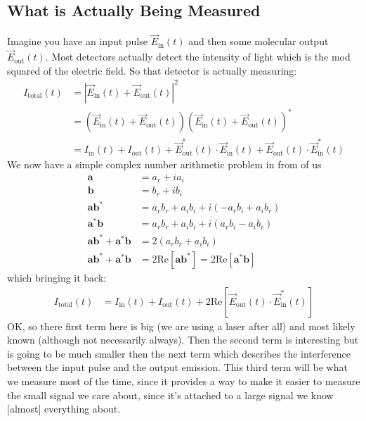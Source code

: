 \subsection{What is Actually Being Measured}
Imagine you have an input pulse $\vec{E}_{\text{in}}(t)$ and then some molecular output $\vec{E}_{\text{out}}(t)$.  Most detectors actually detect the intensity of light which is the mod squared of the electric field.  So that detector is actually measuring:
\begin{align}
	I_{\text{total}}(t) &= \left| \vec{E}_{\text{in}}(t) + \vec{E}_{\text{out}}(t) \right|^2 \\
	&= \left( \vec{E}_{\text{in}}(t) + \vec{E}_{\text{out}}(t) \right) \left( \vec{E}_{\text{in}}(t) + \vec{E}_{\text{out}}(t) \right)^*\\
	&= I_{\text{in}}(t) + I_{\text{out}}(t) + \vec{E}^*_{\text{out}}(t) \cdot  \vec{E}_{\text{in}}(t) +  \vec{E}_{\text{out}}(t) \cdot \vec{E}^*_{\text{in}}(t)
\end{align}
We now have a simple complex number arithmetic problem in from of us
\begin{align*}
	\textbf{a} &= a_r + i a_i \\
	\textbf{b} &= b_r + i b_i \\
	\textbf{a} \textbf{b}^* &= a_r b_r + a_i b_i + i(-a_r b_i + a_i b_r)\\
	\textbf{a}^* \textbf{b} &= a_r b_r + a_i b_i + i(a_r b_i - a_i b_r) \\
	\textbf{a} \textbf{b}^* + \textbf{a}^* \textbf{b} &= 2 \left( a_r b_r + a_i b_i\right) \\
	\textbf{a} \textbf{b}^* + \textbf{a}^* \textbf{b} &= 2 \text{Re}\left[ \textbf{a} \textbf{b}^*  \right]= 2 \text{Re}\left[ \textbf{a}^* \textbf{b}   \right]
\end{align*}
which bringing it back:
\begin{align}
	I_{\text{total}}(t) &= I_{\text{in}}(t) + I_{\text{out}}(t) +  2 \text{Re}\left[ \vec{E}_{\text{out}}(t) \cdot \vec{E}^*_{\text{in}}(t)\right]
\end{align}
OK, so there first term here is big (we are using a laser after all) and most likely known (although not necessarily always).  Then the second term is interesting but is going to be much smaller then the next term which describes the interference between the input pulse and the output emission.  This third term will be what we measure most of the time, since it provides a way to make it easier to measure the small signal we care about, since it's attached to a large signal we know [almost] everything about.



